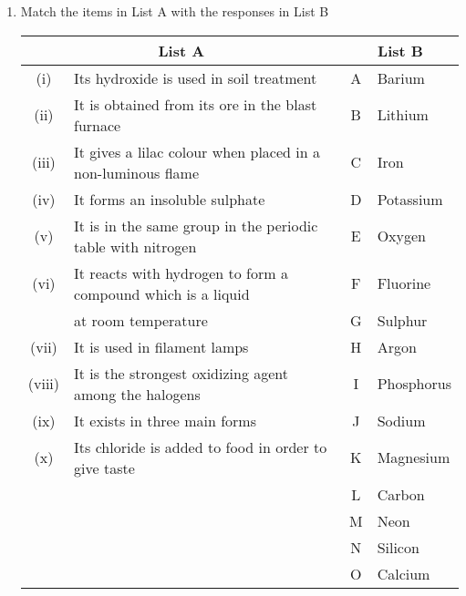 \begin{enumerate}
	\item Match the items in List A with the responses in List B
	\begin{center}
		\begin{tabular}{|cp{9.5cm}|cp{2cm}|} \hline
			\multicolumn{2}{|c|}{List A} & \multicolumn{2}{|c|}{List B} \\ \hline
			(i) & Its hydroxide is used in soil treatment & A & Barium \\
			(ii) & It is obtained from its ore in the blast furnace & B & Lithium \\
			(iii) & It gives a lilac colour when placed in a non-luminous flame & C & Iron \\
			(iv) & It forms an insoluble sulphate & D & Potassium\\
			(v) & It is in the same group in the periodic table with nitrogen & E & Oxygen\\
			(vi) & It reacts with hydrogen to form a compound which is a liquid & F & Fluorine \\
			& at room temperature & G & Sulphur \\
			(vii) & It is used in filament lamps & H & Argon \\
			(viii) & It is the strongest oxidizing agent among the halogens & I & Phosphorus \\
			(ix) & It exists in three main forms & J & Sodium \\
			(x) & Its chloride is added to food in order to give taste & K & Magnesium \\
			& & L & Carbon \\
			& & M & Neon \\
			& & N & Silicon \\
			& & O & Calcium \\ \hline
		\end{tabular}
	\end{center}

\end{enumerate}








